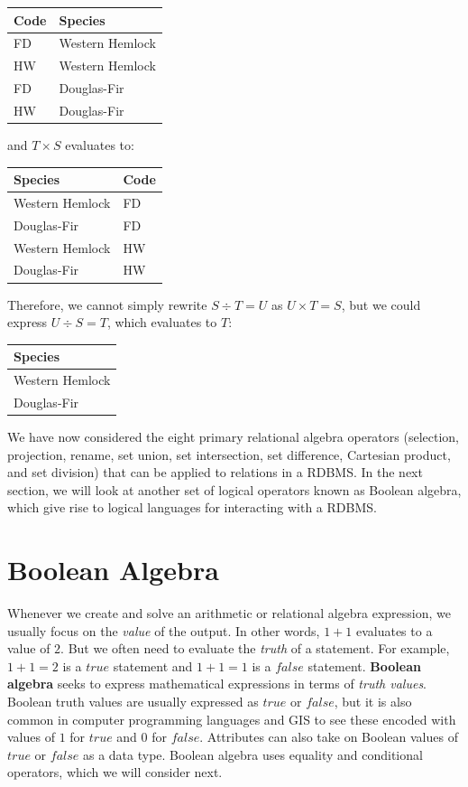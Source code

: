 \documentclass[
]{book}
\begin{document}
\begin{tabular}{ll}
\toprule
Code & Species\\
\midrule
FD & Western Hemlock\\
HW & Western Hemlock\\
FD & Douglas-Fir\\
HW & Douglas-Fir\\
\bottomrule
\end{tabular}

and \(T×S\) evaluates to:

\begin{tabular}{ll}
\toprule
Species & Code\\
\midrule
Western Hemlock & FD\\
Douglas-Fir & FD\\
Western Hemlock & HW\\
Douglas-Fir & HW\\
\bottomrule
\end{tabular}

Therefore, we cannot simply rewrite \(S÷T=U\) as \(U×T=S\), but we could express \(U÷S=T\), which evaluates to \(T\):

\begin{tabular}{l}
\toprule
Species\\
\midrule
Western Hemlock\\
Douglas-Fir\\
\bottomrule
\end{tabular}

We have now considered the eight primary relational algebra operators (selection, projection, rename, set union, set intersection, set difference, Cartesian product, and set division) that can be applied to relations in a RDBMS. In the next section, we will look at another set of logical operators known as Boolean algebra, which give rise to logical languages for interacting with a RDBMS.

\hypertarget{boolean-algebra}{%
\section{Boolean Algebra}\label{boolean-algebra}}

Whenever we create and solve an arithmetic or relational algebra expression, we usually focus on the \emph{value} of the output. In other words, \(1+1\) evaluates to a value of \(2\). But we often need to evaluate the \emph{truth} of a statement. For example, \(1+1=2\) is a \(true\) statement and \(1+1=1\) is a \(false\) statement. \textbf{Boolean algebra} seeks to express mathematical expressions in terms of \emph{truth values}. Boolean truth values are usually expressed as \(true\) or \(false\), but it is also common in computer programming languages and GIS to see these encoded with values of \(1\) for \(true\) and \(0\) for \(false\). Attributes can also take on Boolean values of \(true\) or \(false\) as a data type. Boolean algebra uses equality and conditional operators, which we will consider next.
\end{document}

